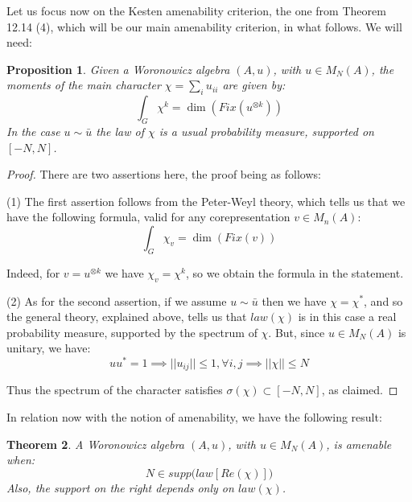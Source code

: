 \documentclass[12pt]{amsbook}
\newtheorem{theorem}{Theorem}[chapter]
\newtheorem{proposition}[theorem]{Proposition}
\begin{document}
Let us focus now on the Kesten amenability criterion, the one from Theorem 12.14 (4), which will be our main amenability criterion, in what follows. We will need:


\begin{proposition}
Given a Woronowicz algebra $(A,u)$, with $u\in M_N(A)$, the moments of the main character $\chi=\sum_iu_{ii}$ are given by:
$$\int_G\chi^k=\dim\left(Fix(u^{\otimes k})\right)$$
In the case $u\sim\bar{u}$ the law of $\chi$ is a usual probability measure, supported on $[-N,N]$.
\end{proposition}

\begin{proof}
There are two assertions here, the proof being as follows:

\medskip

(1) The first assertion follows from the Peter-Weyl theory, which tells us that we have the following formula, valid for any corepresentation $v\in M_n(A)$:
$$\int_G\chi_v=\dim(Fix(v))$$

Indeed, for $v=u^{\otimes k}$ we have $\chi_v=\chi^k$, so we obtain the formula in the statement.

\medskip

(2) As for the second assertion, if we assume $u\sim\bar{u}$ then we have $\chi=\chi^*$, and so the general theory, explained above, tells us that $law(\chi)$ is in this case a real probability measure, supported by the spectrum of $\chi$. But, since $u\in M_N(A)$ is unitary, we have:
$$uu^*=1
\implies||u_{ij}||\leq 1,\forall i,j
\implies||\chi||\leq N$$

Thus the spectrum of the character satisfies $\sigma(\chi)\subset [-N,N]$, as claimed. 
\end{proof}

In relation now with the notion of amenability, we have the following result:


\begin{theorem}
A Woronowicz algebra $(A,u)$, with $u\in M_N(A)$, is amenable when:
$$N\in supp\Big(law\left[Re(\chi)\right]\Big)$$
Also, the support on the right depends only on $law(\chi)$.
\end{theorem}
\end{document}
